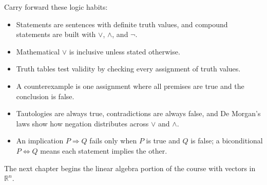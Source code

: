 Carry forward these logic habits:
\begin{itemize}
    \item Statements are sentences with definite truth values, and compound statements are built with \(\lor\), \(\land\), and \(\neg\).
    \item Mathematical \(\lor\) is inclusive unless stated otherwise.
    \item Truth tables test validity by checking every assignment of truth values.
    \item A counterexample is one assignment where all premises are true and the conclusion is false.
    \item Tautologies are always true, contradictions are always false, and De Morgan's laws show how negation distributes across \(\lor\) and \(\land\).
    \item An implication \(P\Rightarrow Q\) fails only when \(P\) is true and \(Q\) is false; a biconditional \(P\Leftrightarrow Q\) means each statement implies the other.
\end{itemize}

The next chapter begins the linear algebra portion of the course with vectors in \(\mathbb{R}^n\).
